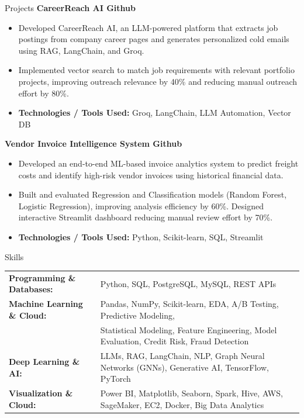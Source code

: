 \documentclass{resume}
\begin{document}
\begin{rSection}{Projects}
\vspace{0.15cm}
{\bf CareerReach AI \textbar{} Github}
\begin{itemize}
    \vspace{-0.2cm}\item Developed CareerReach AI, an LLM-powered platform that extracts job postings from company career pages and generates personalized cold emails using RAG, LangChain, and Groq.
    \vspace{-0.25cm}\item Implemented vector search to match job requirements with relevant portfolio projects, improving outreach relevance by 40\% and reducing manual outreach effort by 80\%.
    \vspace{-0.25cm}\item {\bf Technologies / Tools Used:} Groq, LangChain, LLM Automation, Vector DB
\end{itemize}

\vspace{0.15cm}
{\bf Vendor Invoice Intelligence System \textbar{} Github}
\begin{itemize}
    \vspace{-0.2cm}\item Developed an end-to-end ML-based invoice analytics system to predict freight costs and identify high-risk vendor invoices using historical financial data.
    \vspace{-0.25cm}\item Built and evaluated Regression and Classification models (Random Forest, Logistic Regression), improving analysis efficiency by 60\%. Designed interactive Streamlit dashboard reducing manual review effort by 70\%.
    \vspace{-0.25cm}\item {\bf Technologies / Tools Used:} Python, Scikit-learn, SQL, Streamlit
\end{itemize}

\end{rSection}

\begin{rSection}{Skills}
\begin{tabular}{ @{} >{\bfseries}l @{\hspace{3ex}} l }
Programming \& Databases: & Python, SQL, PostgreSQL, MySQL, REST APIs \\
Machine Learning \& Cloud: & Pandas, NumPy, Scikit-learn, EDA, A/B Testing, Predictive Modeling, \\
& Statistical Modeling, Feature Engineering, Model Evaluation, Credit Risk, Fraud Detection \\
Deep Learning \& AI: & LLMs, RAG, LangChain, NLP, Graph Neural Networks (GNNs), Generative AI, TensorFlow, PyTorch \\
Visualization \& Cloud: & Power BI, Matplotlib, Seaborn, Spark, Hive, AWS, SageMaker, EC2, Docker, Big Data Analytics \\
\end{tabular}
\end{rSection}
\end{document}
